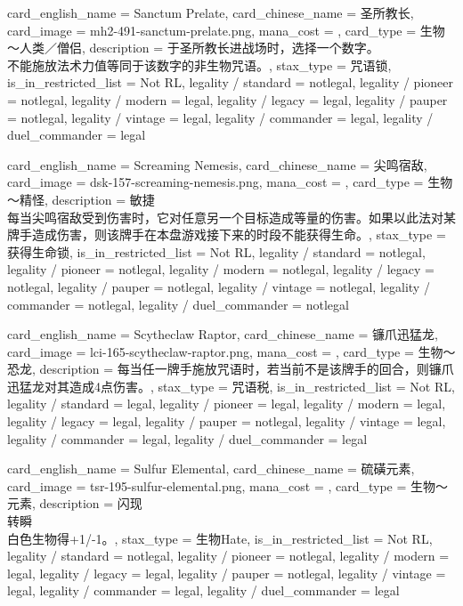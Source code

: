 \documentclass[lang = cn, color = black, 10pt]{AllThatStax}
\begin{document}
\card
{
	card_english_name = {Sanctum Prelate},
	card_chinese_name = {圣所教长},
	card_image = mh2-491-sanctum-prelate.png,
	mana_cost = ,
	card_type = 生物～人类／僧侣,
	description = {于圣所教长进战场时，选择一个数字。\\
不能施放法术力值等同于该数字的非生物咒语。},
	stax_type = 咒语锁,
	is_in_restricted_list = Not RL,
	legality / standard = notlegal,
	legality / pioneer = notlegal,
	legality / modern = legal,
	legality / legacy = legal,
	legality / pauper = notlegal,
	legality / vintage = legal,
	legality / commander = legal,
	legality / duel_commander = legal
}

\card
{
	card_english_name = {Screaming Nemesis},
	card_chinese_name = {尖鸣宿敌},
	card_image = dsk-157-screaming-nemesis.png,
	mana_cost = ,
	card_type = 生物～精怪,
	description = {敏捷\\
每当尖鸣宿敌受到伤害时，它对任意另一个目标造成等量的伤害。如果以此法对某牌手造成伤害，则该牌手在本盘游戏接下来的时段不能获得生命。},
	stax_type = 获得生命锁,
	is_in_restricted_list = Not RL,
	legality / standard = notlegal,
	legality / pioneer = notlegal,
	legality / modern = notlegal,
	legality / legacy = notlegal,
	legality / pauper = notlegal,
	legality / vintage = notlegal,
	legality / commander = notlegal,
	legality / duel_commander = notlegal
}

\card
{
	card_english_name = {Scytheclaw Raptor},
	card_chinese_name = {镰爪迅猛龙},
	card_image = lci-165-scytheclaw-raptor.png,
	mana_cost = ,
	card_type = 生物～恐龙,
	description = {每当任一牌手施放咒语时，若当前不是该牌手的回合，则镰爪迅猛龙对其造成4点伤害。},
	stax_type = 咒语税,
	is_in_restricted_list = Not RL,
	legality / standard = legal,
	legality / pioneer = legal,
	legality / modern = legal,
	legality / legacy = legal,
	legality / pauper = notlegal,
	legality / vintage = legal,
	legality / commander = legal,
	legality / duel_commander = legal
}

\card
{
	card_english_name = {Sulfur Elemental},
	card_chinese_name = {硫磺元素},
	card_image = tsr-195-sulfur-elemental.png,
	mana_cost = ,
	card_type = 生物～元素,
	description = {闪现\\
转瞬\\
白色生物得+1/-1。},
	stax_type = 生物Hate,
	is_in_restricted_list = Not RL,
	legality / standard = notlegal,
	legality / pioneer = notlegal,
	legality / modern = legal,
	legality / legacy = legal,
	legality / pauper = notlegal,
	legality / vintage = legal,
	legality / commander = legal,
	legality / duel_commander = legal
}
\end{document}
